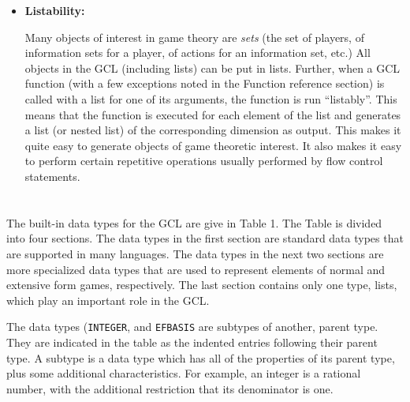 \begin{itemize}
\item {\bf Listability: } 

Many objects of interest in game theory are {\it sets} (the set of
players, of information sets for a player, of actions for an
information set, etc.)  All objects in the GCL (including lists) can
be put in lists.  Further, when a GCL function (with a few exceptions
noted in the Function reference section) is called with a list for
one of its arguments, the function is run ``listably''.  This means
that the function is executed for each element of the list and
generates a list (or nested list) of the corresponding dimension as
output.  This makes it quite easy to generate objects of game
theoretic interest.  It also makes it easy to perform certain
repetitive operations usually performed by flow control statements.
\end{itemize}

\section{}

The built-in data types for the GCL are give in Table 1.  The Table is
divided into four sections. The data types in the first section are
standard data types that are supported in many languages.  The data
types in the next two sections are more specialized data types that
are used to represent elements of normal and extensive form games,
respectively.  The last section contains only one type, lists, which
play an important role in the GCL. 

The data types ({\tt INTEGER}, 
and {\tt EFBASIS} are {\bindex subtypes}
of another, parent type.  They are indicated in the table as the
indented entries following their parent type.  A subtype is a data
type which has all of the properties of its parent type, plus some
additional characteristics.  For example, an integer is a rational
number, with the additional restriction that its denominator is one.

